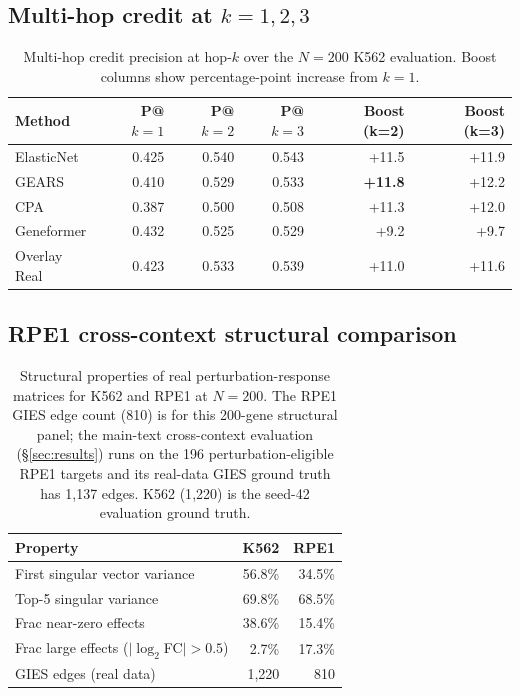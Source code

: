 \documentclass{article}
\theoremstyle{plain}
\theoremstyle{definition}
\theoremstyle{remark}
\begin{document}
\subsection{Multi-hop credit at $k = 1, 2, 3$}

\begin{table}[h]
\centering
\small
\begin{tabular}{lrrrrr}
\toprule
\textbf{Method} & \textbf{P@$k{=}1$} & \textbf{P@$k{=}2$} & \textbf{P@$k{=}3$} & \textbf{Boost (k=2)} & \textbf{Boost (k=3)} \\
\midrule
ElasticNet  & 0.425 & 0.540 & 0.543 & +11.5 & +11.9 \\
GEARS       & 0.410 & 0.529 & 0.533 & \textbf{+11.8} & +12.2 \\
CPA         & 0.387 & 0.500 & 0.508 & +11.3 & +12.0 \\
Geneformer  & 0.432 & 0.525 & 0.529 & +9.2  & +9.7  \\
Overlay Real & 0.423 & 0.533 & 0.539 & +11.0 & +11.6 \\
\bottomrule
\end{tabular}
\caption{Multi-hop credit precision at hop-$k$ over the $N{=}200$ K562 evaluation. Boost columns show percentage-point increase from $k{=}1$.}
\end{table}

\subsection{RPE1 cross-context structural comparison}

\begin{table}[h]
\centering
\small
\begin{tabular}{lrr}
\toprule
\textbf{Property} & \textbf{K562} & \textbf{RPE1} \\
\midrule
First singular vector variance     & 56.8\% & 34.5\% \\
Top-5 singular variance            & 69.8\% & 68.5\% \\
Frac near-zero effects             & 38.6\% & 15.4\% \\
Frac large effects ($|\log_2$FC$|>0.5$) & 2.7\%  & 17.3\% \\
GIES edges (real data)             & 1{,}220 & 810 \\
\bottomrule
\end{tabular}
\caption{Structural properties of real perturbation-response matrices for K562 and RPE1 at $N{=}200$. The RPE1 GIES edge count (810) is for this 200-gene structural panel; the main-text cross-context evaluation (\S\ref{sec:results}) runs on the 196 perturbation-eligible RPE1 targets and its real-data GIES ground truth has 1{,}137 edges. K562 (1{,}220) is the seed-42 evaluation ground truth.}
\end{table}
\end{document}
